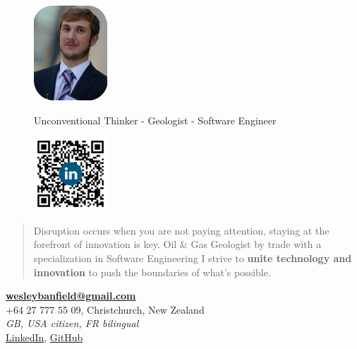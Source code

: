 \documentclass[]{friggeri-cv}
\begin{document}
\begin{figure}[!h]
	\begin{minipage}{0.48\textwidth}
		\begin{flushleft}
			\includegraphics[width=2.75cm]{img/profile.png}
		\end{flushleft}
	\end{minipage}\hfill
 	{Unconventional Thinker - Geologist - Software Engineer}
	\begin{minipage}{0.48\textwidth}
		\begin{flushright}
			\includegraphics[width=2.75cm]{img/QR.png}
		\end{flushright}
	\end{minipage}
\end{figure}
\vspace{-0.75cm}

\begin{quote}
\large
Disruption occurs when you are not paying attention, staying at the forefront of innovation is key. Oil \& Gas Geologist by trade with a specialization in Software Engineering I strive to \textbf{unite technology and innovation} to push the boundaries of what’s possible.
\end{quote}

\begin{center}
\vspace{6pt}
\href{mailto:wesleybanfield@gmail.com}{\textbf{wesleybanfield@gmail.com}}
\\+64 27 777 55 09, Christchurch, New Zealand
\\\emph{GB, USA citizen, FR bilingual}
\vspace{3pt}
\\\href{https://www.linkedin.com/in/wesleybanfield/}{LinkedIn},
\href{https://github.com/WesleyTheGeolien}{GitHub}
\end{center}
\end{document}
